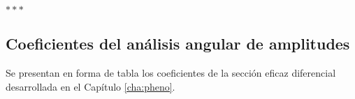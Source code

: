 
\bigskip

\begin{center}
	$***$
\end{center}

\medskip


\begin{subappendices}









\section{Coeficientes del análisis angular de amplitudes}
\label{ap_angdistampana}

Se presentan en forma de tabla los coeficientes de la sección eficaz diferencial desarrollada en el Capítulo \ref{cha:pheno}.






\end{subappendices}

